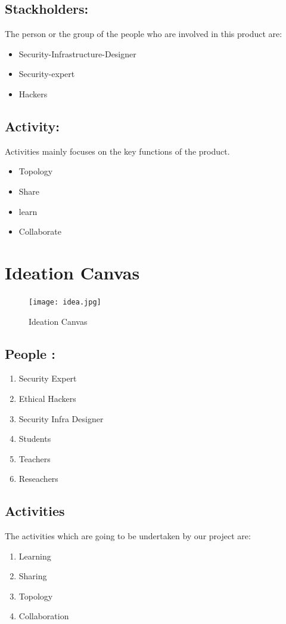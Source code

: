 \documentclass[12pt,a4paper,final,oneside]{report}
\begin{document}
	\subsection{Stackholders:}
	\noindent\par The person or  the group of the people who are involved in this product are:\\
	\noindent 
	\noindent\textbf{}
	\begin{itemize}
	\item Security-Infrastructure-Designer
   \item Security-expert
   \item Hackers 
   	\end{itemize}
   	\subsection{Activity:}
	\noindent\par Activities mainly focuses on the key functions of the product.\\
	\noindent 
	\noindent\textbf{}
	\begin{itemize}
	\item Topology
   \item Share
   \item learn
   \item Collaborate
   	\end{itemize}
\newpage
\raggedright
	\section{Ideation Canvas}
	\begin{figure}[h!]
		\centering
		\texttt{[image: idea.jpg]}
		\caption{Ideation Canvas}
		
	\end{figure}
	
	\subsection{People :}
	\textbf{}
	\begin{enumerate}
	\item Security Expert
	\item Ethical Hackers
	\item Security Infra Designer
	\item Students
	\item Teachers
	\item Reseachers	
	\end{enumerate}
	\subsection{Activities}
 \textbf{}
 The activities which are going to be undertaken by our project are:
	\begin{enumerate}
	\item Learning
	\item Sharing
	\item Topology
	\item Collaboration
	\end{enumerate}
\end{document}
